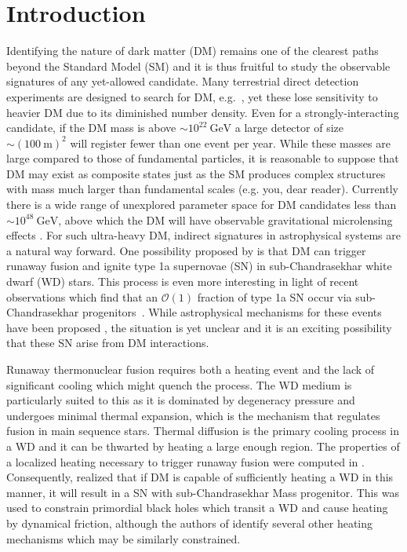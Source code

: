 \documentclass[twocolumn, preprintnumbers,amsmath,amssymb,prd, superscriptaddress]{revtex4}
\newcommand{\OO}{\mathcal{O}}
\newcommand{\GeV}{\text{GeV}}
\begin{document}
\section{Introduction}
\label{sec:Introduction}

Identifying the nature of dark matter (DM) remains one of the clearest paths beyond the Standard Model (SM) and it is thus fruitful to study the observable signatures of any yet-allowed candidate.
Many terrestrial direct detection experiments are designed to search for DM, e.g.~\cite{Akerib:2016vxi, Agnese:2017njq}, yet these lose sensitivity to heavier DM due to its diminished number density.
Even for a strongly-interacting candidate, if the DM mass is above $\sim 10^{22} ~\GeV$ a large detector of size $\sim (100 ~\text{m})^2$ will register fewer than one event per year.
While these masses are large compared to those of fundamental particles, it is reasonable to suppose that DM may exist as composite states just as the SM produces complex structures with mass much larger than fundamental scales (e.g. you, dear reader).
Currently there is a wide range of unexplored parameter space for DM candidates less than $\sim 10^{48} ~\GeV$, above which the DM will have observable gravitational microlensing effects \cite{Griest:2013aaa}.
For such ultra-heavy DM, indirect signatures in astrophysical systems are a natural way forward.
One possibility proposed by \cite{Graham:2015apa} is that DM can trigger runaway fusion and ignite type 1a supernovae (SN) in sub-Chandrasekhar white dwarf (WD) stars.
This process is even more interesting in light of recent observations which find that an $\OO(1)$ fraction of type 1a SN occur via sub-Chandrasekhar progenitors~\cite{Scalzo:2014sap, Scalzo:2014wxa}.
While astrophysical mechanisms for these events have been proposed \cite{Woosley1994,Fink:2007fv}, the situation is yet unclear and it is an exciting possibility that these SN arise from DM interactions.

Runaway thermonuclear fusion requires both a heating event and the lack of significant cooling which might quench the process.
The WD medium is particularly suited to this as it is dominated by degeneracy pressure and undergoes minimal thermal expansion, which is the mechanism that regulates fusion in main sequence stars.
Thermal diffusion is the primary cooling process in a WD and it can be thwarted by heating a large enough region.
The properties of a localized heating necessary to trigger runaway fusion were computed in \cite{Woosley}.
Consequently, \cite{Graham:2015apa} realized that if DM is capable of sufficiently heating a WD in this manner, it will result in a SN with sub-Chandrasekhar Mass progenitor.
This was used to constrain primordial black holes which transit a WD and cause heating by dynamical friction, although the authors of \cite{Graham:2015apa} identify several other heating mechanisms which may be similarly constrained.
\end{document}
